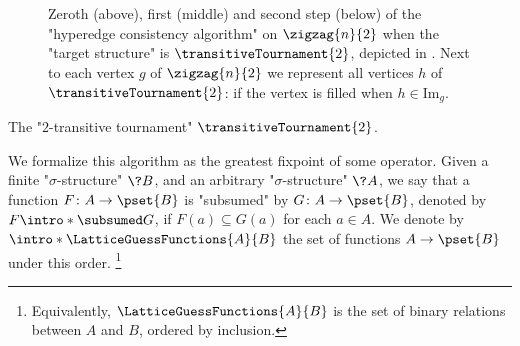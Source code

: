 \begin{figure}
	\centering
	\begin{tikzpicture}
		
		
	\end{tikzpicture}\\[2em]
	\begin{tikzpicture}
		
		
	\end{tikzpicture}\\[2em]
	\begin{tikzpicture}
		
		
	\end{tikzpicture}
	\caption{\AP\label{fig:zigzag-graph-HC-T2} Zeroth (above), first (middle) and second step (below) of the "hyperedge consistency algorithm" on $\zigzag{n}{2}$
	when the "target structure" is $\transitiveTournament{2}$, depicted in . Next to each vertex $g$ of $\zigzag{n}{2}$ we represent
	all vertices $h$ of $\transitiveTournament{2}$: if the vertex is filled
	when $h \in \textrm{Im}_{g}$.
	}
\end{figure}
\begin{marginfigure}[-16em]
	\centering
	\begin{tikzpicture}
		
	\end{tikzpicture}
	\caption{
		\AP\label{fig:zigzag-graph-HC-T2-side-T2}
		The "$2$-transitive tournament" $\transitiveTournament{2}$.
	}
\end{marginfigure}

We formalize this algorithm as the greatest fixpoint of some operator.
Given a finite "$\sigma$-structure" $\?B$, and an arbitrary%
"$\sigma$-structure" $\?A$, we say that a function $F\colon A \to \pset{B}$ is "subsumed"
by $G\colon A \to \pset{B}$, denoted by \AP\(F \intro*\subsumed G\),
if $F(a) \subseteq G(a)$ for each $a \in A$. We denote by
\AP\(\intro*\LatticeGuessFunctions{A}{B}\) the set of functions $A \to \pset{B}$ under this order.%
\footnote{Equivalently, $\LatticeGuessFunctions{A}{B}$ is the
set of binary relations between $A$ and $B$, ordered by inclusion.}

